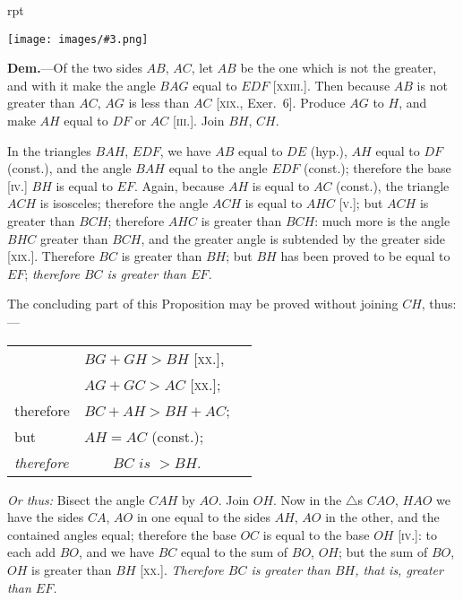\documentclass[oneside]{book}
\newcounter{wrapwidth}
\newcommand\imgflow[3]{
\setcounter{wrapwidth}{#1}
\begin{wrapfigure}[#2]{r}{\value{wrapwidth}pt}
\begin{center}
\vspace{-0.3in}
\texttt{[image: images/\#3.png]}
\end{center}
\end{wrapfigure}
}
\begin{document}
\imgflow{180}{12}{f041}

\textbf{Dem.}---Of the two sides $AB$, $AC$, let $AB$ be the one
which is not the greater, and with it make the angle
$BAG$ equal to $EDF$ [\textsc{xxiii}.]. Then because $AB$ is not
greater than $AC$, $AG$ is less than $AC$ [\textsc{xix}., Exer.~6].
Produce $AG$ to $H$, and make $AH$ equal to $DF$ or $AC$
[\textsc{iii.}]. Join $BH$, $CH$.

In the triangles
$BAH$, $EDF$, we have
$AB$ equal to $DE$
(hyp.), $AH$ equal to
$DF$ (const.), and the
angle $BAH$ equal
to the angle $EDF$
(const.); therefore the
base [\textsc{iv.}] $BH$ is equal
to $EF$. Again, because
$AH$ is equal to $AC$ (const.), the triangle $ACH$ is isosceles;
therefore the angle $ACH$ is equal to $AHC$ [\textsc{v.}];
but $ACH$ is greater than $BCH$; therefore $AHC$ is
greater than $BCH$: much more is the angle $BHC$
greater than $BCH$, and the greater angle is subtended
by the greater side [\textsc{xix.}]. Therefore $BC$ is greater
than $BH$; but $BH$ has been proved to be equal to $EF$;
\textit{therefore $BC$ is greater than $EF$.}\par\medskip

\begin{footnotesize}
The concluding part of this Proposition may be proved without
joining $CH$, thus:---
\\
\begin{tabular*}{\textwidth}{@{} l@{\extracolsep\fill} l r}
& $BG + GH > BH$ [\textsc{xx.}], &\phantom{therefore}  \\[.5ex]
& $AG + GC > AC$ [\textsc{xx.}]; \\[.5ex]
therefore & $BC + AH > BH + AC$; \\[.5ex]
but & $AH = AC$ (const.); \\[.5ex]
\textit{therefore} & \multicolumn{1}{c}{$BC \textit{ is } > BH$.}
\end{tabular*}\par\medskip

\textit{Or thus:} Bisect the angle $CAH$ by $AO$. Join $OH$. Now in
the $\triangle$s $CAO$, $HAO$ we have the sides $CA$, $AO$ in one equal to
the sides $AH$, $AO$ in the other, and the contained angles equal;
therefore the base $OC$ is equal to the base $OH$ [\textsc{iv.}]: to each add
$BO$, and we have $BC$ equal to the sum of $BO$, $OH$; but the sum
of $BO$, $OH$ is greater than $BH$ [\textsc{xx.}]. \textit{Therefore $BC$ is greater
than $BH$, that is, greater than $EF$.}
\par\end{footnotesize}
\end{document}
